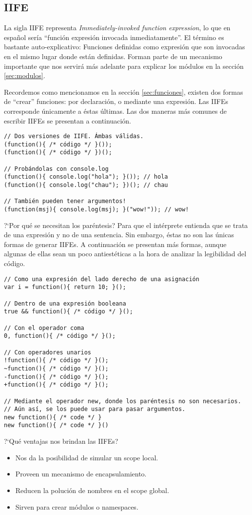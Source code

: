 
\subsection{IIFE}
\label{sec:iife}

La sigla IIFE representa \textit{Immediately-invoked function expression}, lo que en español sería "`función expresión invocada inmediatamente"'. El término es bastante auto-explicativo: Funciones definidas como expresión que son invocadas en el mismo lugar donde están definidas. Forman parte de un mecanismo importante que nos servirá más adelante para explicar los módulos en la sección \ref{sec:modulos}.

Recordemos como mencionamos en la sección \ref{sec:funciones}, existen dos formas de "`crear"' funciones: por declaración, o mediante una expresión. Las IIFEs corresponde únicamente a éstas últimas. Las dos maneras más comunes de escribir IIFEs se presentan a continuación.

\begin{lstlisting}[title={Introduciendo las IIFEs}]
// Dos versiones de IIFE. Ámbas válidas.
(function(){ /* código */ }()); 
(function(){ /* código */ })(); 

// Probándolas con console.log
(function(){ console.log("hola"); }()); // hola
(function(){ console.log("chau"); })(); // chau

// También pueden tener argumentos!
(function(msj){ console.log(msj); }("wow!")); // wow!
\end{lstlisting}

?`Por qué se necesitan los paréntesis? Para que el intérprete entienda que se trata de una expresión y no de una sentencia. Sin embargo, éstas no son las únicas formas de generar IIFEs. A continuación se presentan más formas, aunque algunas de ellas sean un poco antiestéticas a la hora de analizar la legibilidad del código.

\begin{lstlisting}[title={Otras formas de escribir IIFEs}]
// Como una expresión del lado derecho de una asignación
var i = function(){ return 10; }();

// Dentro de una expresión booleana
true && function(){ /* código */ }();

// Con el operador coma
0, function(){ /* código */ }();

// Con operadores unarios
!function(){ /* código */ }();
~function(){ /* código */ }();
-function(){ /* código */ }();
+function(){ /* código */ }();

// Mediante el operador new, donde los paréntesis no son necesarios.
// Aún así, se los puede usar para pasar argumentos.
new function(){ /* code */ }
new function(){ /* code */ }()
\end{lstlisting}

?`Qué ventajas nos brindan las IIFEs?

\begin{itemize}
	\item Nos da la posibilidad de simular un scope local.
	\item Proveen un mecanismo de encapsulamiento.
	\item Reducen la polución de nombres en el scope global.
	\item Sirven para crear módulos o namespaces.
\end{itemize}
